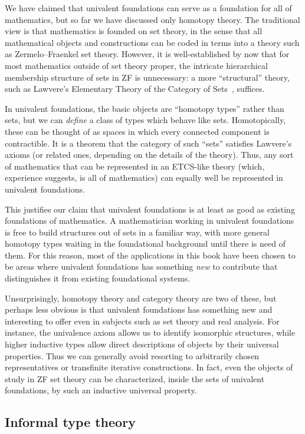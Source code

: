 We have claimed that univalent foundations can serve as a foundation for all of mathematics, but so far we have discussed only homotopy theory.
The traditional view is that mathematics is founded on set theory, in the sense that all mathematical objects and constructions can be coded in terms into a theory such as Zermelo--Fraenkel set theory.
However, it is well-established by now that for most mathematics outside of set theory proper, the intricate hierarchical membership structure of sets in ZF is unnecessary: a more ``structural'' theory, such as Lawvere's Elementary Theory of the Category of Sets~\cite{lawvere:etcs-long}, suffices.

In univalent foundations, the basic objects are ``homotopy types'' rather than sets, but we can \emph{define} a class of types which behave like sets.
Homotopically, these can be thought of as spaces in which every connected component is contractible.
It is a theorem that the category of such ``sets'' satisfies Lawvere's axioms (or related ones, depending on the details of the theory).
Thus, any sort of mathematics that can be represented in an ETCS-like theory (which, experience suggests, is all of mathematics) can equally well be represented in univalent foundations.

This justifies our claim that univalent foundations is at least as good as existing foundations of mathematics.
A mathematician working in univalent foundations is free to build structures out of sets in a familiar way, with more general homotopy types waiting in the foundational background until there is need of them.
For this reason, most of the applications in this book have been chosen to be areas where univalent foundations has something \emph{new} to contribute that distinguishes it from existing foundational systems.

Unsurprisingly, homotopy theory and category theory are two of these, but perhaps less obvious is that univalent foundations has something new and interesting to offer even in subjects such as set theory and real analysis.
For instance, the univalence axiom allows us to identify isomorphic structures, while higher inductive types allow direct descriptions of objects by their universal properties.
Thus we can generally avoid resorting to arbitrarily chosen representatives or transfinite iterative constructions.
In fact, even the objects of study in ZF set theory can be characterized, inside the sets of univalent foundations, by such an inductive universal property.


\subsection*{Informal type theory}

